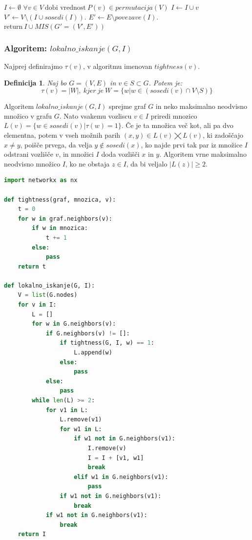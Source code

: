 \documentclass[a4paper, 12pt]{article}
\newtheorem{definicija}{Definicija}
\begin{document}
\begin{algorithm}
\caption{$nakljucni\_MIS(G)$}\label{euclid}
\begin{algorithmic}[1]
\State $\textit{I} \gets \emptyset$
\State $\forall v \in V\ \text{dobi vrednost}\ \textit{P}(v) \in \textit{permutacija}(V)$
\State $ I \gets I \cup v $
\EndIf
\State $V' \gets V \setminus (I \cup \textit{sosedi}(I))$.
\State $E' \gets E \setminus \textit{povezave}(I)$.
\State $\text{return}\  I \cup \textit{MIS}(G'=(V', E'))$
\end{algorithmic}
\end{algorithm}

\newpage

\subsubsection{Algoritem: $lokalno\_iskanje(G, I)$}

Najprej definirajmo $\tau(v)$, v algoritmu imenovan $tightness(v)$.
\begin{definicija}
	Naj bo $G=(V,E)$ in $v \in S \subset G$. Potem je:
	$$\tau(v) = |W|, \ kjer \ je \ W = \{w|w \in (sosedi(v) \cap V \setminus S)\}$$
\end{definicija}

Algoritem $lokalno\_iskanje(G, I)$ sprejme graf $G$ in neko maksimalno neodvisno množico v grafu $G$. Nato vsakemu vozliscu $v \in I$
priredi mnozico $L(v) = \{w \in sosedi(v)| \tau(w) = 1\}$. Če je ta množica več kot, ali pa dvo elementna, potem v vseh možnih parih 
$(x, y) \in L(v) \bigtimes L(v)$, ki zadoščajo $x \neq y$, poišče prvega, da velja $y \notin sosedi(x)$, ko najde prvi tak par iz množice $I$
odstrani vozlišče $v$, in množici $I$ doda vozlišči $x$ in $y$. Algoritem vrne maksimalno neodvisno množico $I$, ko ne obstaja $z \in I$,
da bi veljalo $|L(z)| \geq 2$.

\begin{lstlisting}[language=Python, basicstyle=\tiny]
import networkx as nx

def tightness(graf, mnozica, v): 
    t = 0
    for w in graf.neighbors(v):
        if w in mnozica:
            t += 1
        else:
            pass
    return t

def lokalno_iskanje(G, I): 
    V = list(G.nodes)
    for v in I:
        L = [] 
        for w in G.neighbors(v):
            if G.neighbors(v) != []:
                if tightness(G, I, w) == 1:
                    L.append(w)
                else:
                    pass
            else:
                pass
        while len(L) >= 2:
            for v1 in L:
                L.remove(v1)
                for w1 in L:
                    if w1 not in G.neighbors(v1):
                        I.remove(v)
                        I = I + [v1, w1]
                        break
                    elif w1 in G.neighbors(v1):
                        pass
                if w1 not in G.neighbors(v1):
                    break
            if w1 not in G.neighbors(v1):
                break
    return I
\end{lstlisting}
\end{document}
